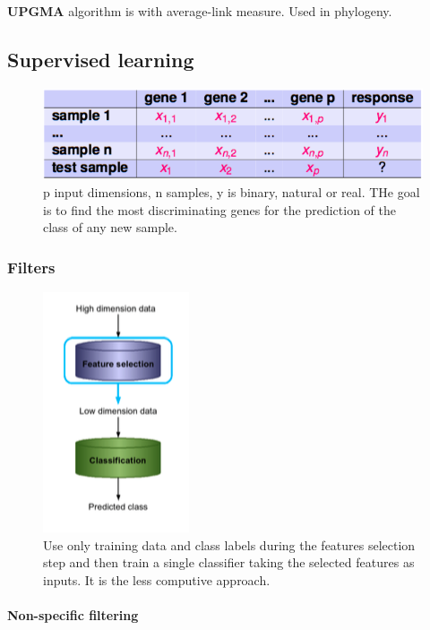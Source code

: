 \textbf{UPGMA} algorithm is with average-link measure. Used in phylogeny.


\subsection{Supervised learning}

\begin{figure}[htp]
	\centering
	\includegraphics[scale=0.6]{images/49_supervised.png}
	\caption{p input dimensions, n samples, y is binary, natural or real. THe goal is to find the most discriminating genes for the prediction of the class of any new sample.}
\end{figure}

\subsubsection{Filters}

\begin{figure}[H]
	\centering
	\includegraphics[scale=0.6]{images/57_filters.png}
	\caption{Use only training data and class labels during the features selection step and then train a single classifier taking the selected features as inputs. It is the less computive approach.}
\end{figure}

\paragraph{Non-specific filtering}

